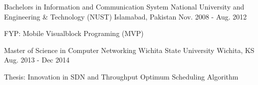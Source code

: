 

\begin{cventries}

  \cventry
    {Bachelors in Information and Communication System} %
    {National University and Engineering \& Technology (NUST)} %
    {Islamabad, Pakistan} %
    {Nov. 2008 - Aug. 2012} %
    {
      \begin{cvitems} %
        \item {FYP: Mobile Visualblock Programing (MVP)}
      \end{cvitems}
    }

  \cventry
    {Master of Science in Computer Networking} %
    {Wichita State University } %
    {Wichita, KS} %
    {Aug. 2013 - Dec 2014} %
    {
      \begin{cvitems} %
        \item {Thesis: Innovation in SDN and Throughput Optimum Scheduling Algorithm}
      \end{cvitems}
    }
\end{cventries}
